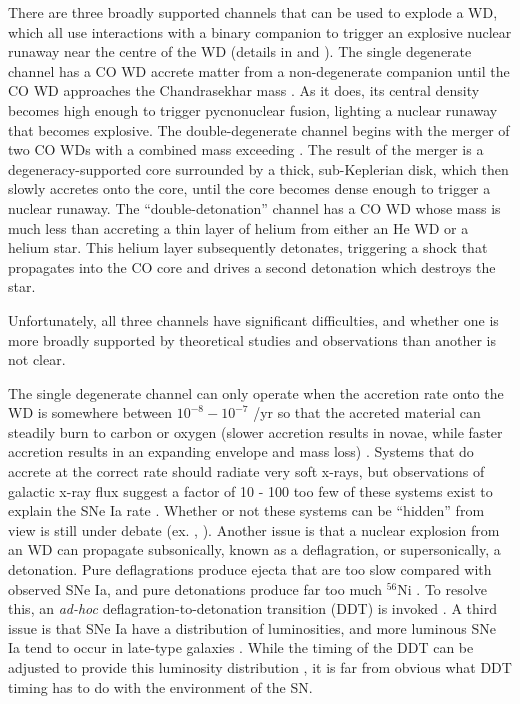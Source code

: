 There are three broadly supported channels that can be used to explode a WD, which all use interactions with a binary companion to trigger an explosive nuclear runaway near the centre of the WD (details in \citealt{howe11} and \citealt{vker12}).  The single degenerate channel has a CO WD accrete matter from a non-degenerate companion until the CO WD approaches the Chandrasekhar mass {\Mch}.  As it does, its central density becomes high enough to trigger pycnonuclear fusion, lighting a nuclear runaway that becomes explosive.  The double-degenerate {\Mch} channel begins with the merger of two CO WDs with a combined mass exceeding {\Mch}.  The result of the merger is a degeneracy-supported core surrounded by a thick, sub-Keplerian disk, which then slowly accretes onto the core, until the core becomes dense enough to trigger a nuclear runaway.  The ``double-detonation'' channel has a CO WD whose mass is much less than {\Mch} accreting a thin layer of helium from either an He WD or a helium star.  This helium layer subsequently detonates, triggering a shock that propagates into the CO core and drives a second detonation which destroys the star.

Unfortunately, all three channels have significant difficulties, and whether one is more broadly supported by theoretical studies and observations than another is not clear.

The single degenerate channel can only operate when the accretion rate onto the WD is somewhere between $10^{-8} - 10^{-7}$ {\Msun}/yr so that the accreted material can steadily burn to carbon or oxygen (slower accretion results in novae, while faster accretion results in an expanding envelope and mass loss) \citep{howe11}.  Systems that do accrete at the correct rate should radiate very soft x-rays, but observations of galactic x-ray flux suggest a factor of 10 - 100 too few of these systems exist to explain the SNe Ia rate \citep{dste10, gilfb10}.  Whether or not these systems can be ``hidden'' from view is still under debate (ex. \citealt{hachkn10}, \citealt{bojedn11}).  Another issue is that a nuclear explosion from an {\Mch} WD can propagate subsonically, known as a deflagration, or supersonically, a detonation.  Pure deflagrations produce ejecta that are too slow compared with observed SNe Ia, and pure detonations produce far too much $^{56}$Ni \citep{hilln00, howe11}.  To resolve this, an \textit{ad-hoc} deflagration-to-detonation transition (DDT) is invoked \citep{khok91, howe11}.  A third issue is that SNe Ia have a distribution of luminosities, and more luminous SNe Ia tend to occur in late-type galaxies \citep{sull10}.  While the timing of the DDT can be adjusted to provide this luminosity distribution \citep{hilln00,vker12}, it is far from obvious what DDT timing has to do with the environment of the SN.

